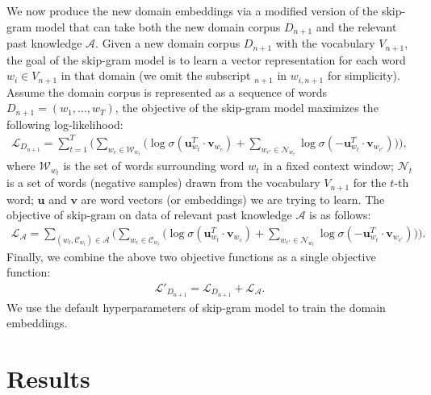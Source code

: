 We now produce the new domain embeddings via a modified version of the skip-gram model \cite{mikolov2013distributed} that can take both the new domain corpus $D_{n+1}$ and the relevant past knowledge $\mathcal{A}$.
Given a new domain corpus $D_{n+1}$ with the vocabulary $V_{n+1}$, the goal of the skip-gram model is to learn a vector representation for each word $w_{i} \in V_{n+1}$ in that domain
(we omit the subscript $_{n+1}$ in $w_{i, n+1}$ for simplicity).
Assume the domain corpus is represented as a sequence of words $D_{n+1}=(w_1, \dots, w_T)$, the objective of the skip-gram model maximizes the following log-likelihood:
\begin{equation}
\label{chap3:eq:sg}
\begin{split}
\mathcal{L}_{D_{n+1}} =\sum_{t=1}^{T} \big( \sum_{w_c \in \mathcal{W}_{w_{t}} } \big(\log \sigma (\bm{u}_{w_t}^T\cdot \bm{v}_{w_c})
+ \sum_{w_{c'} \in \mathcal{N}_{w_t} } \log \sigma(-\bm{u}_{w_t}^T\cdot \bm{v}_{w_{c'}} ) \big) \big) , 
\end{split}
\end{equation}
where $\mathcal{W}_{w_t}$ is the set of words surrounding word $w_t$ in a fixed context window;
$\mathcal{N}_t$ is a set of words (negative samples) drawn from the vocabulary $V_{n+1}$ for the $t$-th word;
$\bm{u}$ and $\bm{v}$ are word vectors (or embeddings) we are trying to learn.
The objective of skip-gram on data of relevant past knowledge $\mathcal{A}$ is as follows:
\begin{equation}
\begin{split}
\mathcal{L}_{\mathcal{A}}=\sum_{(w_t, \mathcal{C}_{w_t} ) \in \mathcal{A}} \big( \sum_{w_c \in \mathcal{C}_{w_t}} \big( \log \sigma (\bm{u}_{w_t}^T\cdot \bm{v}_{w_c})
+ \sum_{w_{c'} \in \mathcal{N}_{w_t} } \log \sigma(-\bm{u}_{w_t}^T\cdot \bm{v}_{w_{c'}} ) \big) \big).
\end{split}
\end{equation}
Finally, we combine the above two objective functions as a single objective function:\\
\begin{equation}
\begin{split}
\mathcal{L}'_{D_{n+1}}=\mathcal{L}_{D_{n+1}} + \mathcal{L}_{\mathcal{A}}.
\end{split}
\end{equation}
We use the default hyperparameters of skip-gram model \cite{mikolov2013distributed} to train the domain embeddings.

\section{Results}
\label{chap3:sec:exp}

